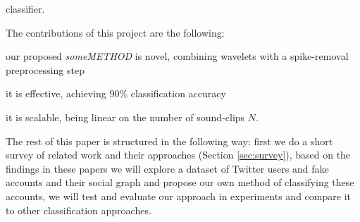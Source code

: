 
      classifier.


The contributions of this project are the following:
\bit
\item our proposed {\em someMETHOD} is novel, combining wavelets
      with a spike-removal  preprocessing step
\item it is effective, achieving 90\% classification accuracy
\item it is scalable, being linear on the number of sound-clips $N$.
\eit

The rest of this paper is structured in the following way: first we do a short survey of related work and their approaches (Section \ref{sec:survey}), based on the findings in these papers we will explore a dataset of Twitter users and fake accounts and their social graph and propose our own method of classifying these accounts, we will test and evaluate our approach in experiments and compare it to other classification approaches.